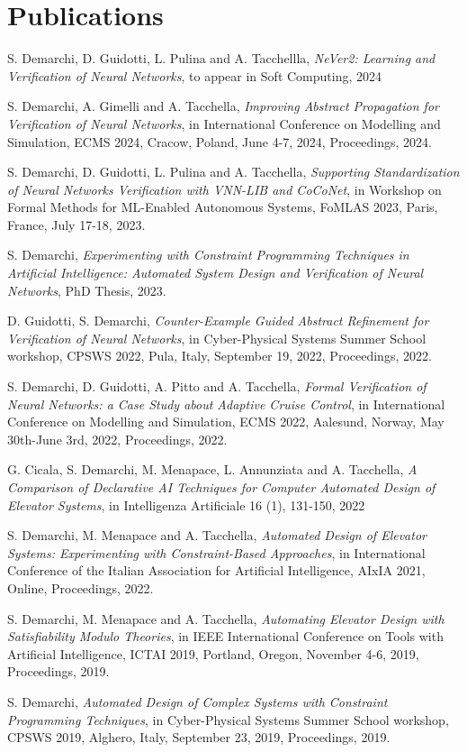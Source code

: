 \section{\sc Publications}

S. Demarchi, D. Guidotti, L. Pulina and A. Tacchellla,
\textit{NeVer2: Learning and Verification of Neural Networks},
to appear in Soft Computing, 2024

S. Demarchi, A. Gimelli and A. Tacchella,
\textit{Improving Abstract Propagation for Verification of Neural
	Networks}, in International Conference on Modelling and
Simulation, ECMS 2024, Cracow, Poland, June 4-7, 2024,
Proceedings, 2024.

S. Demarchi, D. Guidotti, L. Pulina and A. Tacchella, 
\textit{Supporting Standardization of Neural Networks Verification
with VNN-LIB and CoCoNet}, in Workshop on Formal Methods for ML-Enabled 
Autonomous Systems, FoMLAS 2023, Paris, France, July 17-18, 2023.

S. Demarchi, \textit{Experimenting with Constraint Programming
	Techniques in Artificial Intelligence: Automated System Design
	and Verification of Neural Networks}, PhD Thesis, 2023.

D. Guidotti, S. Demarchi, \textit{Counter-Example Guided Abstract
	Refinement for Verification of Neural Networks}, in
Cyber-Physical Systems Summer School workshop, CPSWS 2022, Pula, 
Italy, September 19, 2022, Proceedings, 2022.


S. Demarchi, D. Guidotti, A. Pitto and A. Tacchella, \textit{Formal
	 Verification of Neural Networks: a Case Study about Adaptive 
	 Cruise Control}, in International Conference on Modelling and
Simulation, ECMS 2022, Aalesund, Norway, May 30th-June 3rd, 2022,
Proceedings, 2022.

G. Cicala, S. Demarchi, M. Menapace, L. Annunziata and A. Tacchella,
\textit{A Comparison of Declarative AI Techniques for Computer 
	Automated Design of Elevator Systems}, in Intelligenza Artificiale
16 (1), 131-150, 2022

S. Demarchi, M. Menapace and A. Tacchella, \textit{Automated Design 
	of Elevator Systems: Experimenting with Constraint-Based 
	Approaches}, in International Conference of the Italian 
Association for Artificial Intelligence, AIxIA 2021, Online,
Proceedings, 2022.

S. Demarchi, M. Menapace and A. Tacchella, \textit{Automating Elevator 
	Design with Satisfiability Modulo Theories}, in IEEE International 
Conference on Tools with Artificial Intelligence, ICTAI 2019, Portland, 
Oregon, November 4-6, 2019, Proceedings, 2019.

S. Demarchi, \textit{Automated Design of Complex Systems with Constraint 
	Programming Techniques}, in Cyber-Physical Systems Summer School 
workshop, CPSWS 2019, Alghero, Italy, September 23, 2019, Proceedings, 
2019.